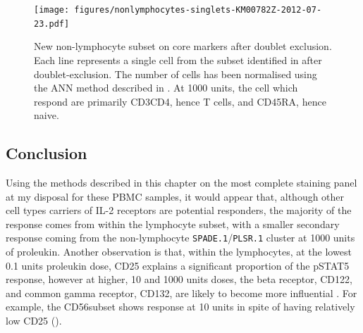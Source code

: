 \begin{figure}
\begin{minipage}{.65\textwidth}
    \texttt{[image: figures/nonlymphocytes-singlets-KM00782Z-2012-07-23.pdf]}
\end{minipage}
\begin{minipage}{.3\textwidth}
{ New non-lymphocyte subset on core markers after doublet exclusion. } 
{
Each line represents a single cell from the subset identified in  after doublet-exclusion.
The number of cells has been normalised using the \gls{ANN} method described in .
At 1000 units, the cell which respond are primarily CD3\positive CD4\positive, hence T cells, and CD45RA\positive, hence naive.
}
\end{minipage}
\end{figure}

\subsection{Conclusion}

Using the methods described in this chapter on the most complete staining panel at my disposal for these \gls{PBMC} samples, it would appear that, although other cell types carriers of IL-2 receptors are potential responders, the majority of the response comes from within the lymphocyte subset, with a smaller secondary response coming from the non-lymphocyte \texttt{SPADE.1}/\texttt{PLSR.1} cluster at 1000 units of proleukin.
Another observation is that, within the lymphocytes, at the lowest 0.1 units proleukin dose, CD25 explains a significant proportion of the pSTAT5 response, however at higher, 10 and 1000 units doses, the beta receptor, CD122, and common gamma receptor, CD132, are likely to become more influential \citep{Pekalski:2013ga}.
For example, the CD56\high subset
shows response at 10 units in spite of having relatively low CD25 ().

